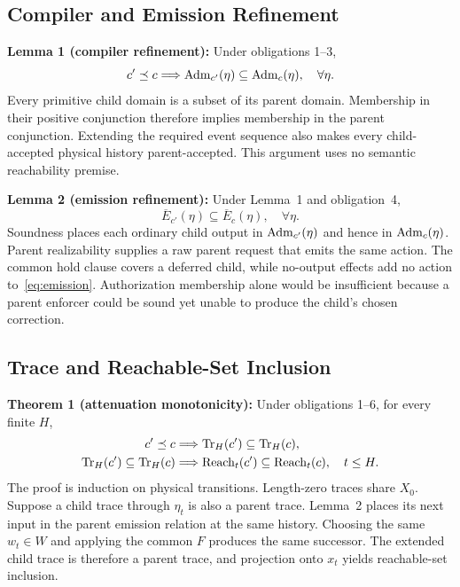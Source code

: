 \subsection{Compiler and Emission Refinement}

\noindent\textbf{Lemma 1 (compiler refinement):} Under obligations 1--3,
\begin{equation}
 c'\preceq c \Longrightarrow
 \operatorname{Adm}_{c'}(\eta)\subseteq\operatorname{Adm}_c(\eta), \quad \forall\eta.
 \label{eq:compiler-refinement}
\end{equation}
Every primitive child domain is a subset of its parent domain. Membership in their positive conjunction therefore implies membership in the parent conjunction. Extending the required event sequence also makes every child-accepted physical history parent-accepted. This argument uses no semantic reachability premise.

\noindent\textbf{Lemma 2 (emission refinement):} Under Lemma~1 and obligation~4,
\begin{equation}
 \overline{E}_{c'}(\eta)\subseteq\overline{E}_c(\eta), \quad \forall\eta.
 \label{eq:emission-refinement}
\end{equation}
Soundness places each ordinary child output in $\operatorname{Adm}_{c'}(\eta)$ and hence in $\operatorname{Adm}_c(\eta)$. Parent realizability supplies a raw parent request that emits the same action. The common hold clause covers a deferred child, while no-output effects add no action to~\eqref{eq:emission}. Authorization membership alone would be insufficient because a parent enforcer could be sound yet unable to produce the child's chosen correction.

\subsection{Trace and Reachable-Set Inclusion}

\noindent\textbf{Theorem 1 (attenuation monotonicity):} Under obligations 1--6, for every finite $H$,
\begin{equation}
 \begin{split}
 c'\preceq c &\Longrightarrow \operatorname{Tr}_H(c')\subseteq\operatorname{Tr}_H(c),\\
 \operatorname{Tr}_H(c')\subseteq\operatorname{Tr}_H(c) &\Longrightarrow
 \operatorname{Reach}_t(c')\subseteq\operatorname{Reach}_t(c),\quad t\leq H.
 \end{split}
 \label{eq:main-theorem}
\end{equation}
The proof is induction on physical transitions. Length-zero traces share $X_0$. Suppose a child trace through $\eta_t$ is also a parent trace. Lemma~2 places its next input in the parent emission relation at the same history. Choosing the same $w_t\in W$ and applying the common $F$ produces the same successor. The extended child trace is therefore a parent trace, and projection onto $x_t$ yields reachable-set inclusion.

